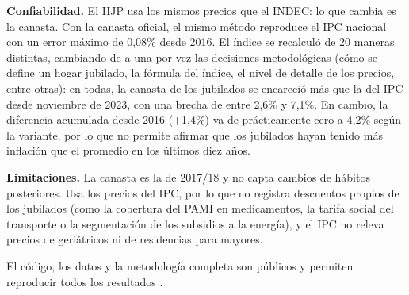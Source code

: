 \documentclass[10pt,a4paper]{article}
\begin{document}
\textbf{Confiabilidad.} El IIJP usa los mismos precios que el INDEC: lo que cambia es la canasta. Con la canasta oficial, el mismo método reproduce el IPC nacional con un error máximo de 0,08\% desde 2016. El índice se recalculó de 20 maneras distintas, cambiando de a una por vez las decisiones metodológicas (cómo se define un hogar jubilado, la fórmula del índice, el nivel de detalle de los precios, entre otras): en todas, la canasta de los jubilados se encareció más que la del IPC desde noviembre de 2023, con una brecha de entre 2,6\% y 7,1\%. En cambio, la diferencia acumulada desde 2016 ($+$1,4\%) va de prácticamente cero a 4,2\% según la variante, por lo que no permite afirmar que los jubilados hayan tenido más inflación que el promedio en los últimos diez años.

\textbf{Limitaciones.} La canasta es la de 2017/18 y no capta cambios de hábitos posteriores. Usa los precios del IPC, por lo que no registra descuentos propios de los jubilados (como la cobertura del PAMI en medicamentos, la tarifa social del transporte o la segmentación de los subsidios a la energía), y el IPC no releva precios de geriátricos ni de residencias para mayores.

El código, los datos y la metodología completa son públicos y permiten reproducir todos los resultados \citep{INECO2026_IIJP_repo}.

\clearpage

\end{document}
